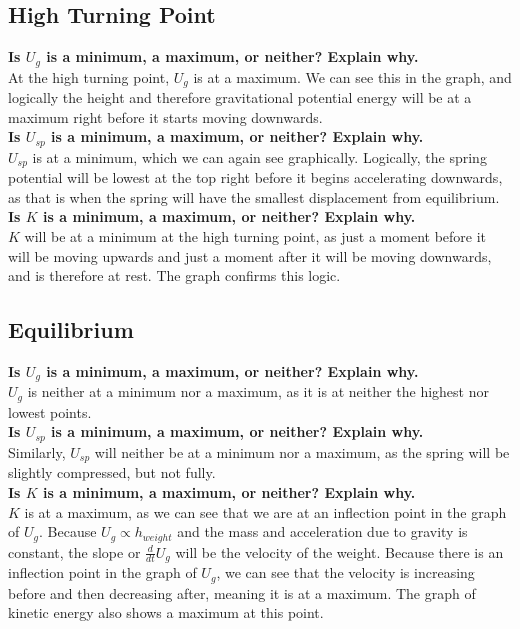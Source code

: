 \documentclass[11pt, letterpaper, includehead]{article}
\begin{document}
\subsection{High Turning Point}
\textbf{Is $U_g$ is a minimum, a maximum, or neither? Explain why.}\\
At the high turning point, $U_g$ is at a maximum. We can see this in the graph,
and logically the height and therefore gravitational potential energy will be at
a maximum right before it starts moving downwards.\\
\textbf{Is $U_{sp}$ is a minimum, a maximum, or neither? Explain why.}\\
$U_{sp}$ is at a minimum, which we can again see graphically. Logically, the
spring potential will be lowest at the top right before it begins accelerating
downwards, as that is when the spring will have the smallest displacement from 
equilibrium.\\
\textbf{Is $K$ is a minimum, a maximum, or neither? Explain why.}\\
$K$ will be at a minimum at the high turning point, as just a moment before
it will be moving upwards and just a moment after it will be moving
downwards, and is therefore at rest. The graph confirms this logic.

\subsection{Equilibrium}
\textbf{Is $U_g$ is a minimum, a maximum, or neither? Explain why.}\\
$U_g$ is neither at a minimum nor a maximum, as it is at neither the highest
nor lowest points.\\
\textbf{Is $U_{sp}$ is a minimum, a maximum, or neither? Explain why.}\\
Similarly, $U_{sp}$ will neither be at a minimum nor a maximum, as the spring
will be slightly compressed, but not fully.\\
\textbf{Is $K$ is a minimum, a maximum, or neither? Explain why.}\\
$K$ is at a maximum, as we can see that we are at an inflection point in the 
graph of $U_g$. Because $U_g \propto h_{weight}$ and the mass and acceleration
due to gravity is constant, the slope or $\frac{d}{dt}U_g$ will be the velocity
of the weight. Because there is an inflection point in the graph of $U_g$, we 
can see that the velocity is increasing before and then decreasing after, meaning
it is at a maximum. The graph of kinetic energy also shows a maximum at this point.
\end{document}
